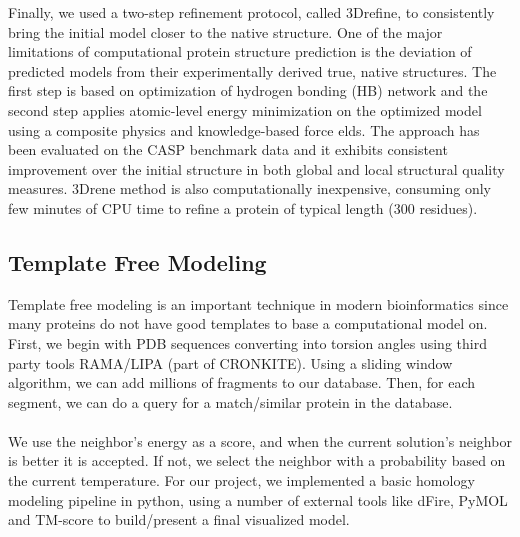 \documentclass{article}
\begin{document}
Finally, we used a two-step refinement protocol, called 3Drefine, to consistently bring the initial model closer to the native structure. One of the major limitations of computational protein structure prediction is the deviation of predicted models from their experimentally derived true, native structures. The first step is based on optimization of hydrogen bonding (HB) network and the second step applies atomic-level energy minimization on the optimized model using a composite physics and knowledge-based force elds. The approach has been evaluated on the CASP benchmark data and it exhibits consistent improvement over the initial structure in both global and local structural quality measures. 3Drene method is also computationally inexpensive, consuming only few minutes of CPU time to refine a protein of typical length (300 residues).


\subsection{Template Free Modeling}

Template free modeling is an important technique in modern bioinformatics since many proteins do not have good templates to base a computational model on. First, we begin with PDB sequences converting into torsion angles using third party tools RAMA/LIPA (part of CRONKITE). Using a sliding window algorithm, we can add millions of fragments to our database. Then, for each segment, we can do a query for a match/similar protein in the database.\\\\
We use the neighbor's energy as a score, and when the current solution’s neighbor is better it is accepted. If not, we select the neighbor with a probability based on the current temperature. For our project, we implemented a basic homology modeling pipeline in python, using a number of external tools like dFire, PyMOL and TM-score to build/present a final visualized model.

\end{document}
